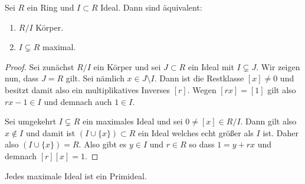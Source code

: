 \documentclass{book}
\begin{document}
\begin{prop}
    \label{prop:maximalfield}
    Sei $R$ ein Ring und $I \subset R$ Ideal. Dann sind äquivalent:
    \begin{enumerate}[label=(\roman *)]
        \item $R/I$ Körper.
        \item $I \subsetneq R$ maximal.
    \end{enumerate}
\end{prop}
\begin{proof}
    Sei zunächst $R/I$ ein Körper und sei $J \subset R$ ein Ideal mit $I
    \subsetneq J$. Wir zeigen nun, dass $J = R$ gilt. Sei nämlich $x \in J
    \setminus I$. Dann ist die Restklasse $[x] \neq 0$ und besitzt damit also
    ein multiplikatives Inverses $[r]$. Wegen $[rx] = [1]$ gilt also $rx - 1 \in
    I$ und demnach auch $1 \in I$. 

    Sei umgekehrt $I \subsetneq R$ ein maximales Ideal und sei $0 \neq [x] \in
    R/I$. Dann gilt also $x \notin I$ und damit ist $(I \cup \{x\}) \subset R$
    ein Ideal welches echt größer als $I$ ist. Daher also $(I \cup \{x\}) = R$.
    Also gibt es $y \in I$ und $r \in R$ so dass $1 = y + rx$ und demnach
    $[r][x] = 1$.
\end{proof}

\begin{cor}
    \label{cor:maxprim}
    Jedes maximale Ideal ist ein Primideal.
\end{cor}
\end{document}
